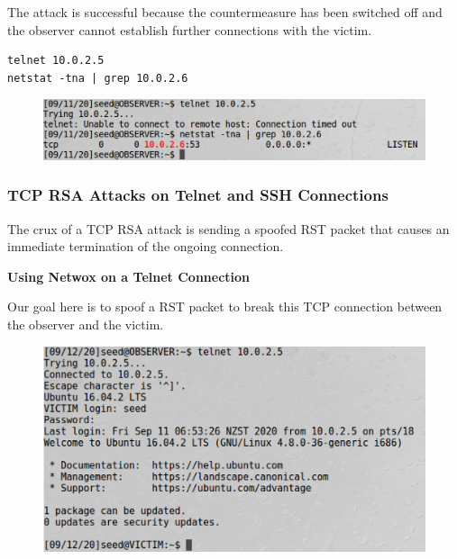 \documentclass[12pt]{article}
\begin{document}
\vspace{0.5in}

\noindent
The attack is successful because the countermeasure has been switched off
and the observer cannot establish further connections with the victim.

\begin{framed}
    \begin{verbatim}
telnet 10.0.2.5
netstat -tna | grep 10.0.2.6
    \end{verbatim}
\end{framed}

\begin{figure}[H]
    \centering
    \includegraphics[width=1\textwidth]{tcp-connection-off.png}
\end{figure}



\newpage

\subsubsection{TCP RSA Attacks on Telnet and SSH Connections}
The crux of a TCP RSA attack is sending a spoofed RST packet that causes
an immediate termination of the ongoing connection.

\begin{center}
    \textbf{Using Netwox on a Telnet Connection}
\end{center}

\noindent
Our goal here is to spoof a RST packet to break this TCP connection
between the observer and the victim.

\begin{figure}[H]
    \centering
    \includegraphics[width=1\textwidth]{tcp-telnet-connection.png}
\end{figure}
\end{document}
